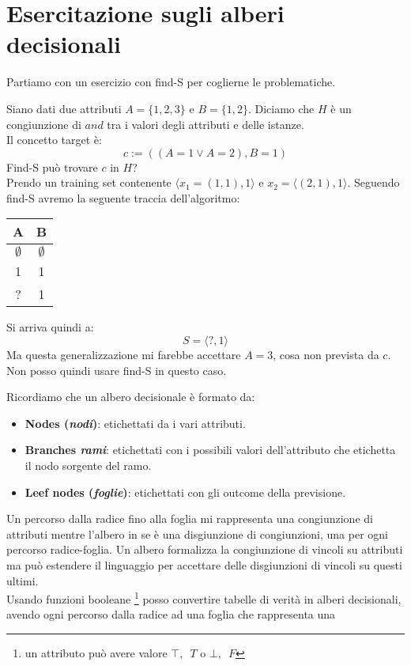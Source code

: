\section{Esercitazione sugli alberi decisionali}
Partiamo con un esercizio con find-S per coglierne le problematiche.
\begin{esercizio}
  Siano dati due attributi $A=\{1,2,3\}$ e $B=\{1,2\}$. Diciamo che $H$ è un
  congiunzione di $and$ tra i valori degli attributi e delle istanze.\\
  Il concetto target è:
  \[c:=((A=1\lor A=2), B=1)\]
  Find-S può trovare $c$ in $H$?\\
  Prendo un training set contenente $\langle x_1=(1,1), 1\rangle$ e
  $x_2=\langle(2,1),1\rangle$. Seguendo find-S 
  avremo la seguente traccia dell'algoritmo:
  \begin{table}[H]
    \centering
    \begin{tabular}{c|c}
      A & B\\
      \hline
      $\emptyset$ & $\emptyset$\\
      1 & 1 \\
      ? & 1
    \end{tabular}
  \end{table}
  Si arriva quindi a:
  \[S=\langle ?,1\rangle\]
  Ma questa generalizzazione mi farebbe accettare $A=3$, cosa non prevista da
  $c$.\\
  Non posso quindi usare find-S in questo caso.
\end{esercizio}
Ricordiamo che un albero decisionale è formato da:
\begin{itemize}
  \item \textbf{Nodes (\textit{nodi})}: etichettati da i vari attributi.
  \item \textbf{Branches \textit{rami}}: etichettati con i possibili valori
  dell'attributo che etichetta il nodo sorgente del ramo.
  \item \textbf{Leef nodes (\textit{foglie})}: etichettati con gli outcome della
  previsione.
\end{itemize}
Un percorso dalla radice fino alla foglia mi rappresenta una congiunzione di
attributi mentre l'albero in se è una disgiunzione di congiunzioni, una
per ogni percorso radice-foglia. Un albero formalizza la congiunzione di
vincoli su attributi ma può estendere il linguaggio per accettare delle disgiunzioni di vincoli su questi ultimi.\\
Usando funzioni booleane \footnote{un attributo può avere valore $\top,\,\,\,T$ o
$\bot,\,\,\,F$} posso convertire tabelle di verità in alberi decisionali, avendo ogni percorso dalla radice ad una foglia che rappresenta una
